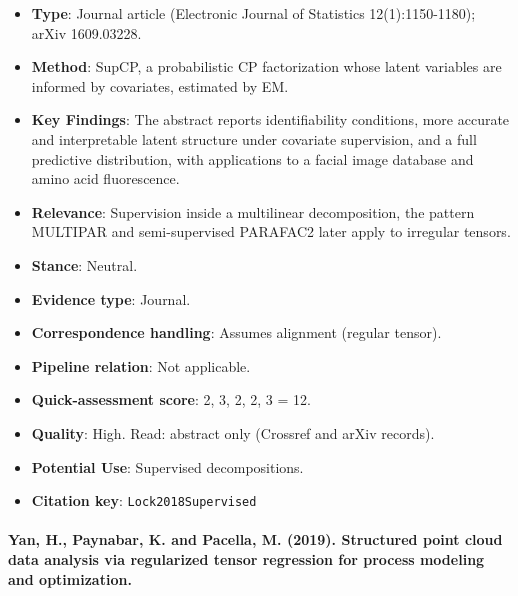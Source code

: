\documentclass[journal,onecolumn]{IEEEtran}
\begin{document}
\begin{itemize}

\item{} \textbf{Type}: Journal article (Electronic Journal of Statistics 12(1):1150-1180); arXiv 1609.03228.

\item{} \textbf{Method}: SupCP, a probabilistic CP factorization whose latent variables are informed by covariates, estimated by EM.

\item{} \textbf{Key Findings}: The abstract reports identifiability conditions, more accurate and interpretable latent structure under covariate supervision, and a full predictive distribution, with applications to a facial image database and amino acid fluorescence.

\item{} \textbf{Relevance}: Supervision inside a multilinear decomposition, the pattern MULTIPAR and semi-supervised PARAFAC2 later apply to irregular tensors.

\item{} \textbf{Stance}: Neutral.

\item{} \textbf{Evidence type}: Journal.

\item{} \textbf{Correspondence handling}: Assumes alignment (regular tensor).

\item{} \textbf{Pipeline relation}: Not applicable.

\item{} \textbf{Quick-assessment score}: 2, 3, 2, 2, 3 = 12.

\item{} \textbf{Quality}: High. Read: abstract only (Crossref and arXiv records).

\item{} \textbf{Potential Use}: Supervised decompositions.

\item{} \textbf{Citation key}: \texttt{Lock2018Supervised}

\end{itemize}

\paragraph{Yan, H., Paynabar, K. and Pacella, M. (2019). Structured point cloud data analysis via regularized tensor regression for process modeling and optimization.~\cite{Yan2019Structured}}\mbox{}
\end{document}
